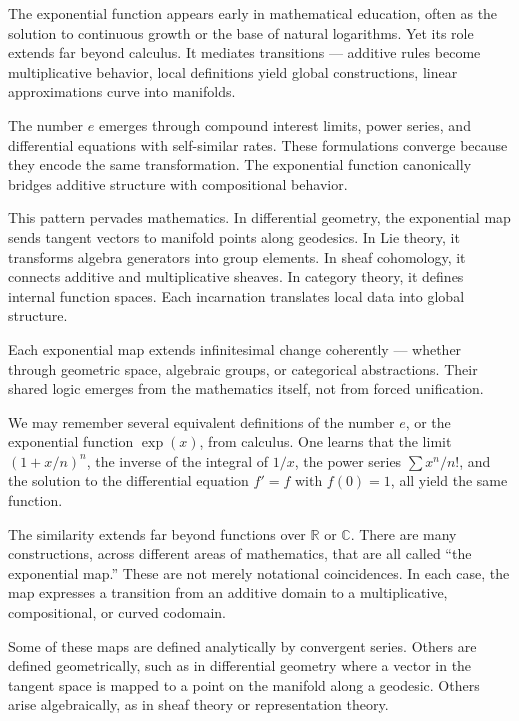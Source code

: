 The exponential function appears early in mathematical education, often as the solution to continuous growth or the base of natural logarithms. Yet its role extends far beyond calculus. It mediates transitions — additive rules become multiplicative behavior, local definitions yield global constructions, linear approximations curve into manifolds.

The number \( e \) emerges through compound interest limits, power series, and differential equations with self-similar rates. These formulations converge because they encode the same transformation. The exponential function canonically bridges additive structure with compositional behavior.

This pattern pervades mathematics. In differential geometry, the exponential map sends tangent vectors to manifold points along geodesics. In Lie theory, it transforms algebra generators into group elements. In sheaf cohomology, it connects additive and multiplicative sheaves. In category theory, it defines internal function spaces. Each incarnation translates local data into global structure.

Each exponential map extends infinitesimal change coherently — whether through geometric space, algebraic groups, or categorical abstractions. Their shared logic emerges from the mathematics itself, not from forced unification.

We may remember several equivalent definitions of the number \( e \), or the exponential function \( \exp(x) \), from calculus. One learns that the limit $\left(1 + x/n\right)^n$,
the inverse of the integral of \( 1/x \), the power series \( \sum x^n/n! \), and the solution to the differential equation \( f' = f \) with \( f(0) = 1 \), all yield the same function.

The similarity extends far beyond functions over \( \mathbb{R} \) or \( \mathbb{C} \). There are many constructions, across different areas of mathematics, that are all called “the exponential map.” These are not merely notational coincidences. In each case, the map expresses a transition from an additive domain to a multiplicative, compositional, or curved codomain.

Some of these maps are defined analytically by convergent series. Others are defined geometrically, such as in differential geometry where a vector in the tangent space is mapped to a point on the manifold along a geodesic. Others arise algebraically, as in sheaf theory or representation theory. 


